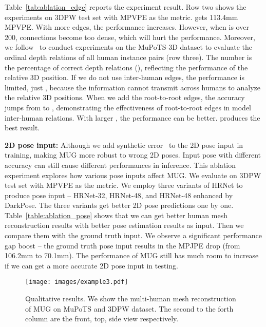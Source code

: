 \documentclass[runningheads]{llncs}
\begin{document}
Table~\ref{tab:ablation_edge} reports the experiment result. 
Row two shows the experiments on 3DPW test set with MPVPE as the metric.
 gets 113.4mm MPVPE. 
With more edges, the performance increases. 
However, when  is over 200, connections become too dense, which will hurt the performance.
Moreover, we follow~\cite{moon2019camera} to conduct experiments on the MuPoTS-3D dataset to evaluate the ordinal depth relations of all human instance pairs (row three). 
The number is the percentage of correct depth relations (), reflecting the performance of the relative 3D position. 
If we do not use inter-human edges, the performance is limited, just , because the information cannot transmit across humans to analyze the relative 3D positions.
When we add the root-to-root edges, the accuracy jumps from  to , demonstrating the effectiveness of root-to-root edges in model inter-human relations. 
With larger , the performance can be better. 
 produces the best result.

\noindent\textbf{2D pose input:}
Although we add synthetic error~\cite{moon2019posefix,choi2020pose2mesh} to the 2D pose input in training, making MUG more robust to wrong 2D poses. 
Input pose with different accuracy can still cause different performances in inference. 
This ablation experiment explores how various pose inputs affect MUG. 
We evaluate on 3DPW test set with MPVPE as the metric.
We employ three variants of HRNet to produce pose input -- HRNet-32, HRNet-48, and HRNet-48 enhanced by DarkPose. 
The three variants get better 2D pose predictions one by one.
Table~\ref{table:ablation_pose} shows that we can get better human mesh reconstruction results with better pose estimation results as input.  
Then we compare them with the ground truth input.
We observe a significant performance gap boost -- the ground truth pose input results in the  MPJPE drop (from 106.2mm to 70.1mm). 
The performance of MUG still has much room to increase if we can get a more accurate 2D pose input in testing.

  \begin{figure}[t!]
    \centering
    {\texttt{[image: images/example3.pdf]}

    \vspace{-12pt} 
  \caption{{Qualitative results}. We show the multi-human mesh reconstruction of MUG on MuPoTS and 3DPW dataset. The second to the forth column are the front, top, side view respectively.} }
    \label{fig:examples}
  \vspace{-12pt} 
  \end{figure}
\end{document}

